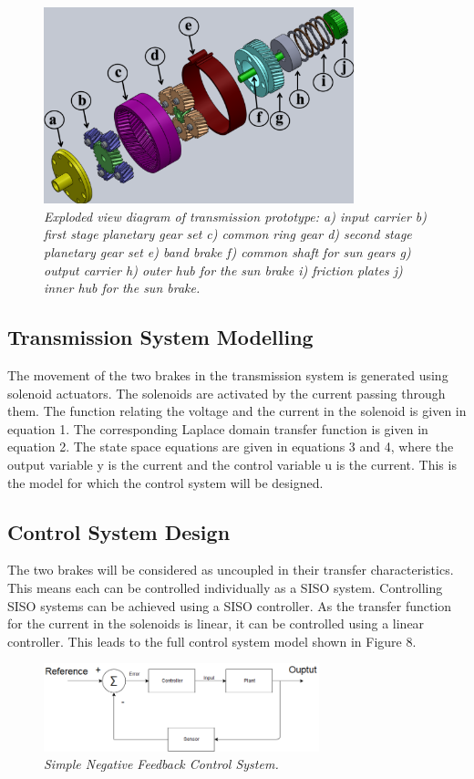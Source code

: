 \documentclass{article}
\begin{document}
\begin{figure}[!ht]
\centering 
\includegraphics[width=9cm]{fig_6.png}
\caption{\small \sl Exploded view diagram of transmission prototype: a) input carrier b) first stage planetary gear set c) common ring gear d) second stage planetary gear set e) band brake f) common shaft for sun gears g) output carrier h) outer hub for the sun brake i) friction plates j) inner hub for the sun brake.}  
\end{figure}

\subsection{Transmission System Modelling }
The movement of the two brakes in the transmission system is generated using solenoid actuators. The solenoids are activated by the current passing through them. The function relating the voltage and the current in the solenoid is given in equation 1. The corresponding Laplace domain transfer function is given in equation 2. The state space equations are given in equations 3 and 4, where the output variable y is the current and the control variable u is the current. This is the model for which the control system will be designed. 

\subsection{Control System Design}
The two brakes will be considered as uncoupled in their transfer characteristics. This means each can be controlled individually as a SISO system. Controlling SISO systems can be achieved using a SISO controller. As the transfer function for the current in the solenoids is linear, it can be controlled using a linear controller. This leads to the full control system model shown in Figure 8.

\begin{figure}[!ht]
\centering 
\includegraphics[width=8cm]{fig_7.png}
\caption{\small \sl Simple Negative Feedback Control System.}  
\end{figure}
\end{document}
